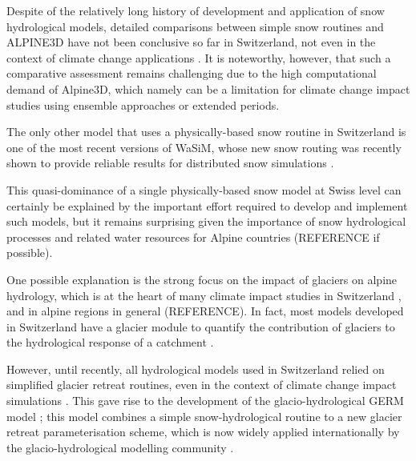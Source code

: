 \documentclass[10pt,a4paper]{article}
\begin{document}
Despite of the relatively long history of development and application of snow hydrological models, detailed comparisons between simple snow routines and ALPINE3D have not been conclusive so far in Switzerland, not even in the context of climate change applications \citep{Kobierska2011, Shakoor2018}. 
It is noteworthy, however, that such a comparative assessment remains challenging due to the high computational demand of Alpine3D, which namely can be a limitation for climate change impact studies using ensemble approaches or extended periods. 

The only other model that uses a physically-based snow routine in Switzerland is one of the most recent versions of WaSiM, whose new snow routing was recently shown to provide reliable results for distributed snow simulations \citep{Thornton2021}. 

This quasi-dominance of a single physically-based snow model at Swiss level can certainly be explained by the important effort required to develop and implement such models, but it remains surprising given the importance of snow hydrological processes and related water resources for Alpine countries (REFERENCE if possible).

One possible explanation is the strong focus on the impact of glaciers 
on alpine hydrology, which is at the heart of many climate impact studies in Switzerland \citep{Horton2006, Schaefli2007b, Junghans2011, Addor2014, Finger2015, Etter2017}, and in alpine regions in general (REFERENCE). In fact, most models developed in Switzerland have a glacier module to quantify the contribution of glaciers to the hydrological response of a catchment \citep[see for example][]{Finger2011, Verbunt2003, Zappa2007a, Uhlmann2013a}. 
 
However, until recently, all hydrological models used in Switzerland relied on simplified glacier retreat routines, even in the context of climate change impact simulations \citep[e.g.][]{Horton2006}. 
This gave rise to the development of the glacio-hydrological GERM model \citep{Huss2016, Junghans2011, Farinotti2012, Finger2013}; this model combines a simple snow-hydrological routine to a new glacier retreat parameterisation scheme, which is now widely applied internationally by the glacio-hydrological modelling community \citep[][called $\Delta$h-parametrisation]{Huss2010}.
\end{document}
